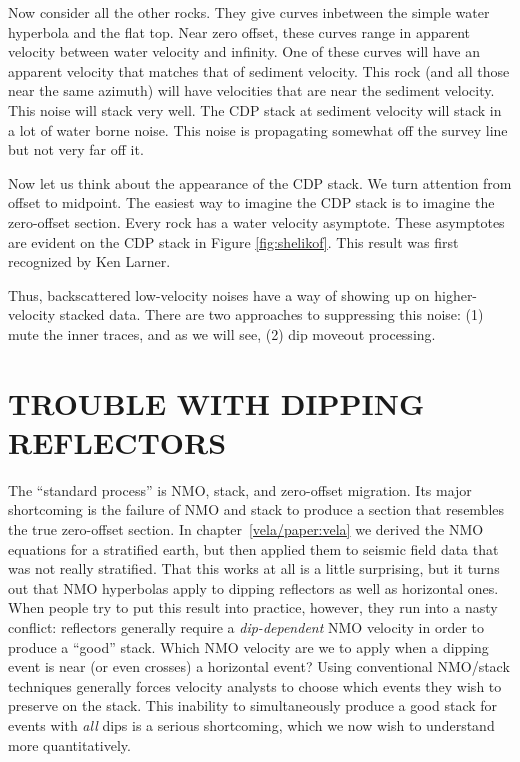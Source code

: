 \par
Now consider all the other rocks.
They give curves inbetween the simple water hyperbola and the flat top.
Near zero offset, these curves range in apparent velocity
between water velocity and infinity.
One of these curves will have an apparent velocity that matches
that of sediment velocity.
This rock (and all those near the same azimuth)
will have velocities that are near the sediment velocity.
This noise will stack very well.
The CDP stack at sediment velocity will stack
in a lot of water borne noise.
This noise is propagating somewhat off the survey line
but not very far off it.

\par
Now let us think about the appearance of the CDP stack.
We turn attention from offset to midpoint.
The easiest way to imagine the CDP stack
is to imagine the zero-offset section.
Every rock has a water velocity asymptote.
These asymptotes are evident on
the CDP stack in Figure \ref{fig:shelikof}.
This result was first recognized by Ken Larner.

\par
Thus, backscattered low-velocity noises have
a way of showing up on higher-velocity stacked data.
There are two approaches
to suppressing this noise:
(1) mute the inner traces,
and as we will see,
(2) dip moveout processing.


\section{TROUBLE WITH DIPPING REFLECTORS}
\par
The ``standard process'' is NMO, stack, and zero-offset migration.
Its major shortcoming is the failure of NMO and stack
to produce a section that resembles the true zero-offset section.
In chapter~\ref{vela/paper:vela} we derived
the NMO equations for a stratified earth,
but then applied them to seismic field data 
that was not really stratified.
That this works at all is a little surprising,
but it turns out that NMO hyperbolas
apply to dipping reflectors as well as horizontal ones.
When people try to put this result into practice,
however,
they run into a nasty conflict:
reflectors generally require a {\em dip-dependent}
NMO velocity in order to produce a ``good'' stack.
Which NMO velocity are we to apply
when a dipping event is near (or even crosses) a horizontal event?  
Using conventional NMO/stack techniques
generally forces velocity analysts to choose
which events they wish to preserve on the stack.
This inability to simultaneously produce a good stack
for events with {\em all} dips is a serious shortcoming,
which we now wish to understand more quantitatively.

